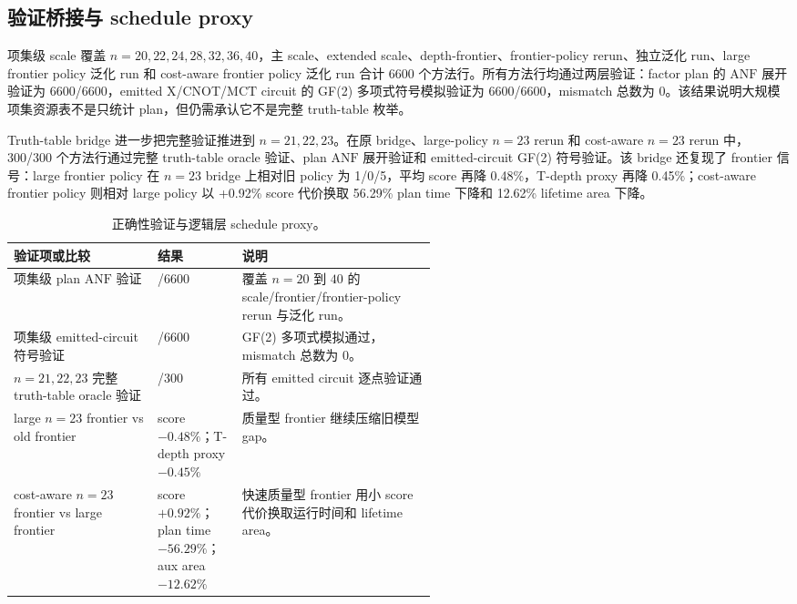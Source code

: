 \documentclass[UTF8,fontset=macnew,11pt]{ctexart}
\newcommand{\anf}{\ensuremath{\mathrm{ANF}}}
\newcommand{\ttable}{truth-table}
\newcommand{\mct}{\ensuremath{\mathrm{MCT}}}
\begin{document}
\subsection{验证桥接与 schedule proxy}

项集级 scale 覆盖 $n=20,22,24,28,32,36,40$，主 scale、extended scale、depth-frontier、frontier-policy rerun、独立泛化 run、large frontier policy 泛化 run 和 cost-aware frontier policy 泛化 run 合计 6600 个方法行。所有方法行均通过两层验证：factor plan 的 \anf{} 展开验证为 6600/6600，emitted X/CNOT/\mct{} circuit 的 GF(2) 多项式符号模拟验证为 6600/6600，mismatch 总数为 0。该结果说明大规模项集资源表不是只统计 plan，但仍需承认它不是完整 \ttable{} 枚举。

Truth-table bridge 进一步把完整验证推进到 $n=21,22,23$。在原 bridge、large-policy $n=23$ rerun 和 cost-aware $n=23$ rerun 中，300/300 个方法行通过完整 \ttable{} oracle 验证、plan \anf{} 展开验证和 emitted-circuit GF(2) 符号验证。该 bridge 还复现了 frontier 信号：large frontier policy 在 $n=23$ bridge 上相对旧 policy 为 1/0/5，平均 score 再降 0.48\%，T-depth proxy 再降 0.45\%；cost-aware frontier policy 则相对 large policy 以 +0.92\% score 代价换取 56.29\% plan time 下降和 12.62\% lifetime area 下降。

\begin{table}[H]
\centering
\small
\caption{正确性验证与逻辑层 schedule proxy。}
\label{tab:verification-v27}
\begin{tabularx}{\linewidth}{>{\raggedright\arraybackslash}p{0.34\linewidth}>{\raggedright\arraybackslash}p{0.20\linewidth}>{\raggedright\arraybackslash}X}
\toprule
验证项或比较 & 结果 & 说明 \\
\midrule
项集级 plan \anf{} 验证 & 6600/6600 & 覆盖 $n=20$ 到 $40$ 的 scale/frontier/frontier-policy rerun 与泛化 run。 \\
项集级 emitted-circuit 符号验证 & 6600/6600 & GF(2) 多项式模拟通过，mismatch 总数为 0。 \\
$n=21,22,23$ 完整 \ttable{} oracle 验证 & 300/300 & 所有 emitted circuit 逐点验证通过。 \\
large $n=23$ frontier vs old frontier & score $-0.48\%$；T-depth proxy $-0.45\%$ & 质量型 frontier 继续压缩旧模型 gap。 \\
cost-aware $n=23$ frontier vs large frontier & score $+0.92\%$；plan time $-56.29\%$；aux area $-12.62\%$ & 快速质量型 frontier 用小 score 代价换取运行时间和 lifetime area。 \\
\bottomrule
\end{tabularx}
\end{table}
\end{document}
